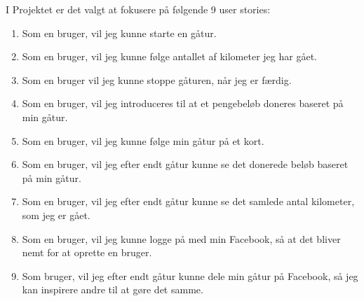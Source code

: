 I Projektet er det valgt at fokusere på følgende 9 user stories:
\begin{enumerate}

\item Som en bruger, vil jeg kunne starte en gåtur.
\item Som en bruger, vil jeg kunne følge antallet af kilometer jeg har gået. 
\item Som en bruger vil jeg kunne stoppe gåturen, når jeg er færdig. 
\item Som en bruger, vil jeg introduceres til at et pengebeløb doneres baseret på min gåtur. 
\item Som en bruger, vil jeg kunne følge min gåtur på et kort. 
\item Som en bruger, vil jeg efter endt gåtur kunne se det donerede beløb baseret på min gåtur. 
\item Som en bruger, vil jeg efter endt gåtur kunne se det samlede antal kilometer, som jeg er gået. 
\item Som en bruger, vil jeg kunne logge på med min Facebook, så at det bliver nemt for at oprette en bruger. 
\item Som bruger, vil jeg efter endt gåtur kunne dele min gåtur på Facebook, så jeg kan inspirere andre til at gøre det samme. 
\end{enumerate}